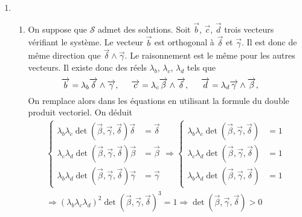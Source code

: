 \begin{enumerate}
\item 
\begin{enumerate}
 \item On suppose que $\mathcal{S}$ admet des solutions. Soit $\overrightarrow{b}$, $\overrightarrow{c}$, $\overrightarrow{d}$ trois vecteurs vérifiant le système.\newline
Le vecteur $\overrightarrow{b}$ est orthogonal à $\overrightarrow{\delta}$ et $\overrightarrow{\gamma}$. Il est donc de même direction que $\overrightarrow{\delta}\wedge \overrightarrow{\gamma} $. Le raisonnement est le même pour les autres vecteurs. Il existe donc des réels $\lambda_{b}$, $\lambda_{c}$, $\lambda_{d}$ tels que 
\begin{displaymath}
 \overrightarrow{b} = \lambda_{b}\overrightarrow{\delta}\wedge \overrightarrow{\gamma},\hspace{0.5cm}
 \overrightarrow{c} = \lambda_{c}\overrightarrow{\beta}\wedge \overrightarrow{\delta},\hspace{0.5cm}
 \overrightarrow{d} = \lambda_{d}\overrightarrow{\gamma}\wedge \overrightarrow{\beta},\hspace{0.5cm}
\end{displaymath}
On remplace alors dans les équations en utilisant la formule du double produit vectoriel. On déduit
\begin{multline*}
 \left\lbrace 
\begin{aligned}
\lambda_b \lambda_c \det(\overrightarrow{\beta},\overrightarrow{\gamma},\overrightarrow{\delta}) \overrightarrow{\delta}
&=\overrightarrow{\delta}\\
\lambda_c \lambda_d \det(\overrightarrow{\beta},\overrightarrow{\gamma},\overrightarrow{\delta}) \overrightarrow{\beta}
&=\overrightarrow{\beta}\\
\lambda_b \lambda_d \det(\overrightarrow{\beta},\overrightarrow{\gamma},\overrightarrow{\delta})\overrightarrow{\gamma}
&=\overrightarrow{\gamma}
\end{aligned}
\right. 
\Rightarrow
 \left\lbrace 
\begin{aligned}
\lambda_b \lambda_c \det(\overrightarrow{\beta},\overrightarrow{\gamma},\overrightarrow{\delta}) &=1\\
\lambda_c \lambda_d \det(\overrightarrow{\beta},\overrightarrow{\gamma},\overrightarrow{\delta}) &=1\\
\lambda_b \lambda_d \det(\overrightarrow{\beta},\overrightarrow{\gamma},\overrightarrow{\delta}) &=1
\end{aligned}
\right. \\ 
\Rightarrow
(\lambda_b \lambda_c \lambda_d)^2 \det(\overrightarrow{\beta},\overrightarrow{\gamma},\overrightarrow{\delta})^3 = 1
\Rightarrow \det(\overrightarrow{\beta},\overrightarrow{\gamma},\overrightarrow{\delta}) >0
\end{multline*}


\end{enumerate}
\end{enumerate}
